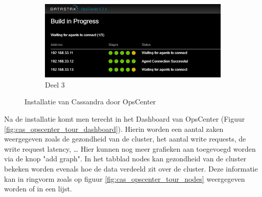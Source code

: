 \begin{figure}[H]
\begin{subfigure}{.49\textwidth}
  		\centering
  		\includegraphics[width=.9\linewidth]{img/4_installatie_cassandra/1_Configuration_part_6}
  		\caption{Deel 3}
	\end{subfigure}
	\caption{Installatie van Cassandra door OpsCenter}
	\label{fig:cas_install}
\end{figure}

Na de installatie komt men terecht in het Dashboard van OpsCenter (Figuur \ref{fig:cas_opscenter_tour_dashboard}).
Hierin worden een aantal zaken weergegeven zoals de gezondheid van de cluster, het aantal write requests, de write request latency, \ldots
Hier kunnen nog meer grafieken aan toegevoegd worden via de knop "add graph".
In het tabblad nodes kan gezondheid van de cluster bekeken worden evenals hoe de data verdeeld zit over de cluster.
Deze informatie kan in ringvorm zoals op figuur \ref{fig:cas_opscenter_tour_nodes} weergegeven worden of in een lijst.

